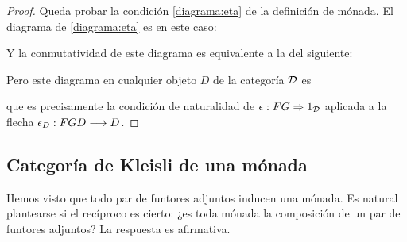 \begin{proof}
  Queda probar la condición \eqref{diagrama:eta} de la definición
  de mónada. El diagrama de \eqref{diagrama:eta} es en este caso:
  \begin{center}
  \end{center}
  Y la conmutatividad de este diagrama es
  equivalente a la del siguiente:
  \begin{center}
  \end{center}
  Pero este diagrama en cualquier objeto $D$ de la categoría $\mathcal{D}$ es
  \begin{center}
  \end{center}
  que es precisamente la condición de naturalidad de
  $\epsilon : FG\Rightarrow 1_{\mathcal{D}}$ aplicada a la flecha
  $\epsilon_D : FGD\longrightarrow D$.
\end{proof}


\subsection{Categoría de Kleisli de una mónada}
Hemos visto que todo par de funtores adjuntos inducen una mónada.
Es natural plantearse si el recíproco es cierto: ¿es toda mónada
la composición de un par de funtores adjuntos?
La respuesta es afirmativa.

